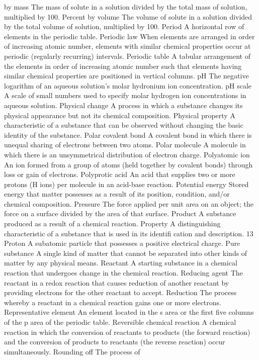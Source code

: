 \documentclass[10pt, roman]{article}
\begin{document}
by mass The mass of solute in a solution divided by the total mass of solution, multiplied by 100. Percent by volume The volume of solute in a solution divided by the total volume of solution, multiplied by 100. 
Period A horizontal row of elements in the periodic table. Periodic law When elements are arranged in order of increasing atomic number, elements with similar chemical properties occur at periodic (regularly 
recurring) intervals. Periodic table A tabular arrangement of the elements in order of increasing atomic number such that elements having similar chemical properties are positioned in vertical columns. pH The 
negative logarithm of an aqueous solution’s molar hydronium ion concentration. pH scale A scale of small numbers used to specify molar hydrogen ion concentrations in aqueous solution. Physical change A process 
in which a substance changes its physical appearance but not its chemical composition. Physical property A characteristic of a substance that can be observed without changing the basic identity of the substance. 
Polar covalent bond A covalent bond in which there is unequal sharing of electrons between two atoms. Polar molecule A molecule in which there is an unsymmetrical distribution of electron charge. Polyatomic ion An ion 
formed from a group of atoms (held together by covalent bonds) through loss or gain of electrons. Polyprotic acid An acid that supplies two or more protons (H ions) per molecule in an acid-base reaction. Potential 
energy Stored energy that matter possesses as a result of its position, condition, and/or chemical composition. Pressure The force applied per unit area on an object; the force on a surface divided by the area of that 
surface. Product A substance produced as a result of a chemical reaction. Property A distinguishing characteristic of a substance that is used in its identifi cation and description. 13 Proton A subatomic particle 
that possesses a positive electrical charge. Pure substance A single kind of matter that cannot be separated into other kinds of matter by any physical means. Reactant A starting substance in a chemical reaction that 
undergoes change in the chemical reaction. Reducing agent The reactant in a redox reaction that causes reduction of another reactant by providing electrons for the other reactant to accept. Reduction The process 
whereby a reactant in a chemical reaction gains one or more electrons. Representative element An element located in the s area or the first five columns of the p area of the periodic table. Reversible chemical 
reaction A chemical reaction in which the conversion of reactants to products (the forward reaction) and the conversion of products to reactants (the reverse reaction) occur simultaneously. Rounding off The process of 
\end{document}
